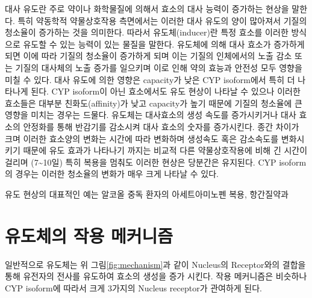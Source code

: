 \documentclass[
  11pt,
  krantz2, a4paper, twoside]{krantz}
\begin{document}
대사 유도란 주로 약이나 화학물질에 의해서 효소의 대사 능력이 증가하는 현상을 말한다. 특히 약동학적 약물상호작용 측면에서는 이러한 대사 유도의 양이 많아져서 기질의 청소율이 증가하는 것을 의미한다.
따라서 유도체(inducer)란 특정 효소를 이러한 방식으로 유도할 수 있는 능력이 있는 물질을 말한다.
유도체에 의해 대사 효소가 증가하게 되면 이에 따라 기질의 청소율이 증가하게 되며 이는 기질의 인체에서의 노출 감소 또는 기질의 대사체의 노출 증가를 일으키며 이로 인해 약의 효능과 안전성 모두 영향을 미칠 수 있다.
대사 유도에 의한 영향은 capacity가 낮은 CYP isoform에서 특히 더 나타나게 된다. CYP isoform이 아닌 효소에서도 유도 현상이 나타날 수 있으나 이러한 효소들은 대부분 친화도(affinity)가 낮고 capacity가 높기 때문에 기질의 청소율에 큰 영향을 미치는 경우는 드물다.
유도체는 대사효소의 생성 속도를 증가시키거나 대사 효소의 안정화를 통해 반감기를 감소시켜 대사 효소의 숫자를 증가시킨다.
종간 차이가 크며 이러한 효소양의 변화는 시간에 따라 변화하며 생성속도 혹은 감소속도를 변화시키기 때문에 유도 효과가 나타나기 까지는 비교적 다른 약물상호작용에 비해 긴 시간이 걸리며 (7\textasciitilde10일) 특히 복용을 멈춰도 이러한 현상은 당분간은 유지된다. CYP isoform의 경우는 이러한 청소율의 변화가 매우 크게 나타날 수 있다.

유도 현상의 대표적인 예는 알코올 중독 환자의 아세트아미노펜 복용, 항간질약과

\hypertarget{uxc720uxb3c4uxccb4uxc758-uxc791uxc6a9-uxba54uxcee4uxb2c8uxc998}{%
\section{유도체의 작용 메커니즘}\label{uxc720uxb3c4uxccb4uxc758-uxc791uxc6a9-uxba54uxcee4uxb2c8uxc998}}

일반적으로 유도체는 위 그림\ref{fig:mechanism}과 같이 Nucleus의 Receptor와의 결합을 통해 유전자의 전사를 유도하여 효소의 생성을 증가 시킨다.
작용 메커니즘은 비슷하나 CYP isoform에 따라서 크게 3가지의 Nucleus receptor가 관여하게 된다.
\end{document}
